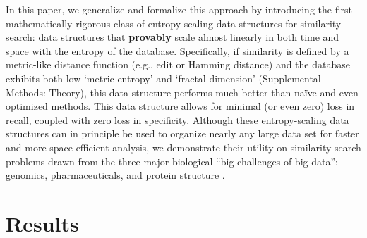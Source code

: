 \documentclass[review,preprint,12pt]{elsarticle}
\renewcommand{\cite}{\citep} %
\theoremstyle{definition}
\theoremstyle{remark}
\numberwithin{equation}{section}
\begin{document}
In this paper, we generalize and formalize this approach by introducing the first mathematically rigorous class of entropy-scaling data structures for similarity search: data structures that \textbf{provably} scale almost linearly in both time and space with the entropy of the database.
Specifically, if similarity is defined by a metric-like distance function (e.g., edit or Hamming distance) and the database exhibits both low `metric entropy' and `fractal dimension' (Supplemental Methods: Theory), this data structure performs much better than na\"ive and even optimized methods.
This data structure allows for minimal (or even zero) loss in recall, coupled
with zero loss in specificity.
Although these entropy-scaling data structures can in principle be used to organize nearly any large data set for faster and more space-efficient analysis,
we demonstrate their utility on similarity search problems drawn from the three major biological ``big challenges of big data'': genomics, pharmaceuticals, and protein structure \cite{marx2013biology}.

\section{Results}
\end{document}
